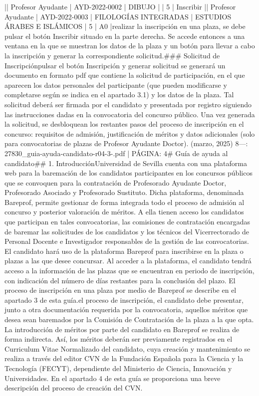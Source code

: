 \documentclass{article}
\begin{document}
\begin{itemize}
      |\n| Profesor Ayudante       | AYD-2022-0002   | DIBUJO                                        |                                              | 5           | Inscribir  |\n| Profesor Ayudante       | AYD-2022-0003   | FILOLOGÍAS INTEGRADAS                         | ESTUDIOS ÁRABES E ISLÁMICOS                 | 5           | A0         |\n\nPara realizar la inscripción en una plaza, se debe pulsar el botón Inscribir situado en la parte derecha. Se accede entonces a una ventana en la que se muestran los datos de la plaza y un botón para llevar a cabo la inscripción y generar la correspondiente solicitud.\n\n### Solicitud de Inscripción\n\nAl pulsar el botón Inscripción y generar solicitud se generará un documento en formato pdf que contiene la solicitud de participación, en el que aparecen los datos personales del participante (que pueden modificarse y completarse según se indica en el apartado 3.1) y los datos de la plaza. Tal solicitud deberá ser firmada por el candidato y presentada por registro siguiendo las instrucciones dadas en la convocatoria del concurso público. Una vez generada la solicitud, se desbloquean los restantes pasos del proceso de inscripción en el concurso: requisitos de admisión, justificación de méritos y datos adicionales (solo para convocatorias de plazas de Profesor Ayudante Doctor).\n{} (marzo, 2025) 8\n\n---\n\nFUENTE: 27830_guia-ayuda-candidato-r04-3-.pdf | PÁGINA: 4\n# Guía de ayuda al candidato\n\n## 1. Introducción\n\nLa Universidad de Sevilla cuenta con una plataforma web para la baremación de los candidatos participantes en los concursos públicos que se convoquen para la contratación de Profesorado Ayudante Doctor, Profesorado Asociado y Profesorado Sustituto. Dicha plataforma, denominada Bareprof, permite gestionar de forma integrada todo el proceso de admisión al concurso y posterior valoración de méritos. A ella tienen acceso los candidatos que participan en tales convocatorias, las comisiones de contratación encargadas de baremar las solicitudes de los candidatos y los técnicos del Vicerrectorado de Personal Docente e Investigador responsables de la gestión de las convocatorias. El candidato hará uso de la plataforma Bareprof para inscribirse en la plaza o plazas a las que desee concursar. Al acceder a la plataforma, el candidato tendrá acceso a la información de las plazas que se encuentran en periodo de inscripción, con indicación del número de días restantes para la conclusión del plazo. El proceso de inscripción en una plaza por medio de Bareprof se describe en el apartado 3 de esta guía.\n\nDurante el proceso de inscripción, el candidato debe presentar, junto a otra documentación requerida por la convocatoria, aquellos méritos que desea sean baremados por la Comisión de Contratación de la plaza a la que opta. La introducción de méritos por parte del candidato en Bareprof se realiza de forma indirecta. Así, los méritos deberán ser previamente registrados en el Curriculum Vitae Normalizado del candidato, cuya creación y mantenimiento se realiza a través del editor CVN de la Fundación Española para la Ciencia y la Tecnología (FECYT), dependiente del Ministerio de Ciencia, Innovación y Universidades. En el apartado 4 de esta guía se proporciona una breve descripción del proceso de creación del CVN.\n\nCada 
\end{itemize}
\end{document}
